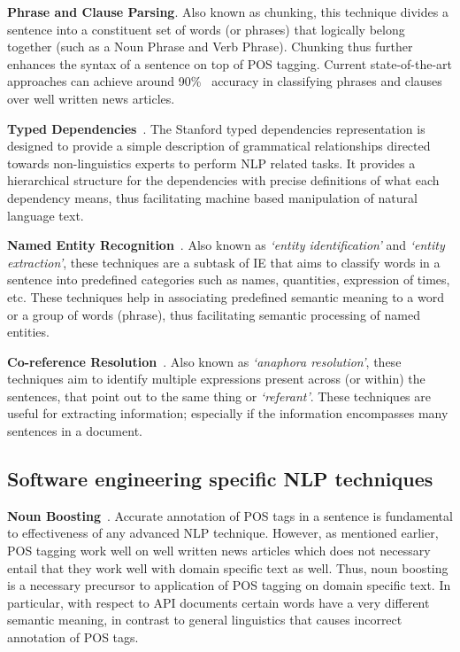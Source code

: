 \textbf{Phrase and Clause Parsing}. Also known as chunking, this technique divides a sentence into a constituent set of words (or phrases) that logically belong together (such as a Noun Phrase and Verb Phrase). Chunking thus further enhances the syntax of a sentence on top of POS tagging. Current state-of-the-art approaches can achieve around 90\%~\cite{SNLP1} accuracy in classifying phrases and clauses over well written news articles.

\textbf{Typed Dependencies}~\cite{Marneffe06LREC,Marneffe08COLING}. The Stanford typed dependencies representation  is designed to provide a simple description of grammatical relationships directed towards non-linguistics experts to perform NLP related tasks. It provides a hierarchical structure for the dependencies with precise definitions of what each dependency means, thus facilitating machine based manipulation of natural language text.

\textbf{Named Entity Recognition}~\cite{Finkel05ACL}. Also known as \textit{`entity identification'} and \textit{`entity extraction'}, these techniques are a subtask of IE that aims to classify words in a sentence into predefined categories such as names, quantities, expression of times, etc. These techniques help in associating predefined semantic meaning to a word or a group of words (phrase), thus facilitating semantic processing of named entities. 

\textbf{Co-reference Resolution}~\cite{RaghunathanEMNLP10,LeeCoNLL11}. Also known as \textit{`anaphora resolution'}, these techniques aim to identify multiple expressions present across (or within) the sentences, that point out to the same thing or \textit{`referant'}. These techniques are useful for extracting information; especially if the information encompasses many sentences in a document.


\subsection{Software engineering specific NLP techniques}
\label{sub:SENLPback}

\textbf{Noun Boosting}~\cite{pandita12:inferring}. Accurate annotation of POS tags in a sentence is fundamental to effectiveness of any advanced NLP technique.
However, as mentioned earlier, POS tagging work well on well written news articles which does not necessary entail that they work well with domain specific text as well.
Thus, noun boosting is a necessary precursor to application of POS tagging on domain specific text.
In particular, with respect to API documents certain words have a very different semantic meaning, in contrast to general linguistics that causes incorrect annotation of POS tags.

